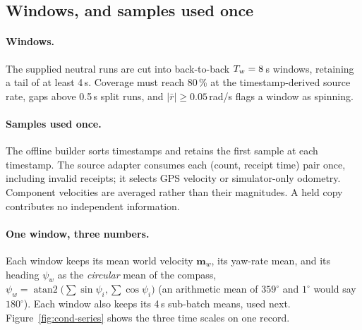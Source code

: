 \subsection{Windows, and samples used once}

\paragraph{Windows.} The supplied neutral runs are cut into back-to-back
$T_w=8$\,s windows, retaining a tail of at least 4\,s. Coverage must reach
80\,\% at the timestamp-derived source rate, gaps above 0.5\,s split runs,
and $|\bar r|\ge0.05$\,rad/s flags a window as spinning.

\paragraph{Samples used once.} The offline builder sorts timestamps and retains
the first sample at each timestamp. The source adapter consumes each
(count, receipt time) pair once, including invalid receipts; it selects GPS
velocity or simulator-only odometry. Component velocities are averaged rather
than their magnitudes. A held copy contributes no independent information.

\paragraph{One window, three numbers.} Each window keeps its mean world velocity
$\bm m_w$, its yaw-rate mean, and its heading $\psi_w$ as the \emph{circular} mean
of the compass, $\psi_w = \operatorname{atan2}\big(\sum\sin\psi_i, \sum\cos\psi_i\big)$
(an arithmetic mean of $359^\circ$ and $1^\circ$ would say $180^\circ$). Each window also keeps its 4\,s
sub-batch means, used next. Figure~\ref{fig:cond-series} shows the three time
scales on one record.

